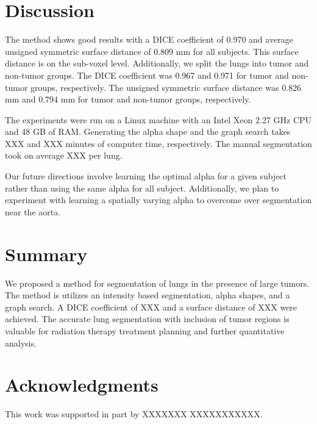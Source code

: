 \documentclass{llncs}
\begin{document}
\section{Discussion}
%

The method shows good results with a DICE coefficient of 0.970 and average unsigned symmetric surface distance of 0.809 mm for all subjects. This surface distance is on the sub-voxel level. Additionally, we split the lungs into tumor and non-tumor groups. The DICE coefficient was 0.967 and 0.971 for tumor and non-tumor groups, respectively. The unsigned symmetric surface distance was 0.826 mm and 0.794 mm for tumor and non-tumor groups, respectively.

The experiments were run on a Linux machine with an Intel Xeon 2.27 GHz CPU and 48 GB of RAM. Generating the alpha shape and the graph search takes XXX and XXX minutes of computer time, respectively. The manual segmentation took on average XXX per lung.

Our future directions involve learning the optimal alpha for a given subject rather than using the same alpha for all subject. Additionally, we plan to experiment with learning a spatially varying alpha to overcome over segmentation near the aorta.
%
\section{Summary}
%
We proposed a method for segmentation of lungs in the presence of large tumors. The method is utilizes an intensity based segmentation, alpha shapes, and a graph search. A DICE coefficient of XXX and a surface distance of XXX were achieved. The accurate lung segmentation with  inclusion of tumor regions is valuable for radiation therapy treatment planning and further quantitative analysis.
%
\section{Acknowledgments}
%
This work was supported in part by 
XXXXXXX XXXXXXXXXXX.


%
%









\clearpage
{} %
\renewcommand{\indexname}{Author Index}
\printindex
\clearpage

\end{document}
